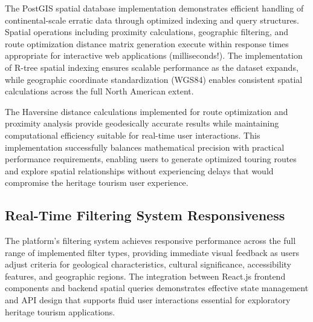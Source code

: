 The PostGIS spatial database implementation demonstrates efficient handling of continental-scale erratic data through optimized indexing and query structures. Spatial operations including proximity calculations, geographic filtering, and route optimization distance matrix generation execute within response times appropriate for interactive web applications (milliseconds!). The implementation of R-tree spatial indexing ensures scalable performance as the dataset expands, while geographic coordinate standardization (WGS84) enables consistent spatial calculations across the full North American extent.


The Haversine distance calculations implemented for route optimization and proximity analysis provide geodesically accurate results while maintaining computational efficiency suitable for real-time user interactions. This implementation successfully balances mathematical precision with practical performance requirements, enabling users to generate optimized touring routes and explore spatial relationships without experiencing delays that would compromise the heritage tourism user experience.

\subsection{Real-Time Filtering System Responsiveness}
\label{subsec:filtering_responsiveness}

The platform's filtering system achieves responsive performance across the full range of implemented filter types, providing immediate visual feedback as users adjust criteria for geological characteristics, cultural significance, accessibility features, and geographic regions. The integration between React.js frontend components and backend spatial queries demonstrates effective state management and API design that supports fluid user interactions essential for exploratory heritage tourism applications.

